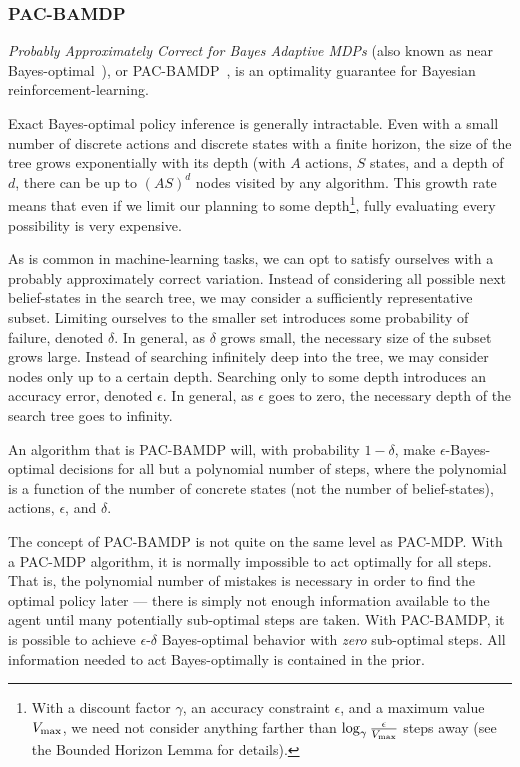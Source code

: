 \subsubsection{PAC-BAMDP}

\emph{Probably Approximately Correct for Bayes Adaptive MDPs} (also known as near Bayes-optimal~\cite{kolter09}), or PAC-BAMDP~\cite{araya2012near}, is an optimality guarantee for Bayesian reinforcement-learning.

Exact Bayes-optimal policy inference is generally intractable. Even with a small number of discrete actions and discrete states with a finite horizon, the size of the tree grows exponentially with its depth (with $A$ actions, $S$ states, and a depth of $d$, there can be up to $(A S)^d$ nodes visited by any algorithm. This growth rate means that even if we limit our planning to some depth\footnote{With a discount factor $\gamma$, an accuracy constraint $\epsilon$, and a maximum value $V_{\rm max}$, we need not consider anything farther than $\log_\gamma \frac \epsilon {V_{\rm max}}$ steps away (see the Bounded Horizon Lemma for details). }, fully evaluating every possibility is very expensive.

As is common in machine-learning tasks, we can opt to satisfy ourselves with a probably approximately correct variation. Instead of considering all possible next belief-states in the search tree, we may consider a sufficiently representative subset. Limiting ourselves to the smaller set introduces some probability of failure, denoted $\delta$. In general, as $\delta$ grows small, the necessary size of the subset grows large. Instead of searching infinitely deep into the tree, we may consider nodes only up to a certain depth. Searching only to some depth introduces an accuracy error, denoted $\epsilon$. In general, as $\epsilon$ goes to zero, the necessary depth of the search tree goes to infinity.

An algorithm that is PAC-BAMDP will, with probability $1-\delta$, make $\epsilon$-Bayes-optimal decisions for all but a polynomial number of steps, where the polynomial is a function of the number of concrete states (not the number of belief-states), actions, $\epsilon$, and $\delta$.

The concept of PAC-BAMDP is not quite on the same level as PAC-MDP. With a PAC-MDP algorithm, it is normally impossible to act optimally for all steps. That is, the polynomial number of mistakes is necessary in order to find the optimal policy later --- there is simply not enough information available to the agent until many potentially sub-optimal steps are taken. With PAC-BAMDP, it is possible to achieve $\epsilon$-$\delta$ Bayes-optimal behavior with \emph{zero} sub-optimal steps. All information needed to act Bayes-optimally is contained in the prior.

